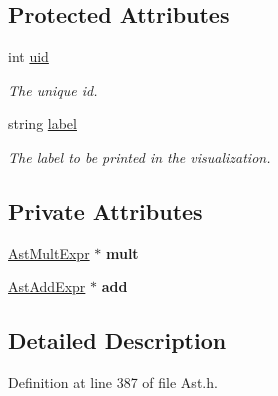 \subsection*{Protected Attributes}
\begin{DoxyCompactItemize}
\item 
\hypertarget{classAST_a847b778f1c3dd5a19de32de432ee6e15}{int \hyperlink{classAST_a847b778f1c3dd5a19de32de432ee6e15}{uid}}\label{classAST_a847b778f1c3dd5a19de32de432ee6e15}

\begin{DoxyCompactList}\small\item\em The unique id. \end{DoxyCompactList}\item 
\hypertarget{classAST_ab2e239ccc0688d2341724432ff5a1a31}{string \hyperlink{classAST_ab2e239ccc0688d2341724432ff5a1a31}{label}}\label{classAST_ab2e239ccc0688d2341724432ff5a1a31}

\begin{DoxyCompactList}\small\item\em The label to be printed in the visualization. \end{DoxyCompactList}\end{DoxyCompactItemize}
\subsection*{Private Attributes}
\begin{DoxyCompactItemize}
\item 
\hypertarget{classAstAddExpr_a1290fb7d961dfc6911d87803817188bb}{\hyperlink{classAstMultExpr}{Ast\-Mult\-Expr} $\ast$ {\bfseries mult}}\label{classAstAddExpr_a1290fb7d961dfc6911d87803817188bb}

\item 
\hypertarget{classAstAddExpr_a3bf1a1fdfde1ae7e4485d5048eea8cfb}{\hyperlink{classAstAddExpr}{Ast\-Add\-Expr} $\ast$ {\bfseries add}}\label{classAstAddExpr_a3bf1a1fdfde1ae7e4485d5048eea8cfb}

\end{DoxyCompactItemize}


\subsection{Detailed Description}


Definition at line 387 of file Ast.\-h.



